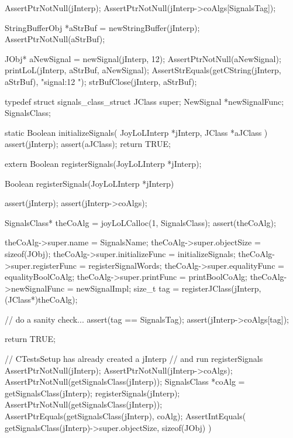 
\startCTest
  AssertPtrNotNull(jInterp);
  AssertPtrNotNull(jInterp->coAlgs[SignalsTag]);

  StringBufferObj *aStrBuf = newStringBuffer(jInterp);
  AssertPtrNotNull(aStrBuf);
  
  JObj* aNewSignal = newSignal(jInterp, 12);
  AssertPtrNotNull(aNewSignal);
  printLoL(jInterp, aStrBuf, aNewSignal);
  AssertStrEquals(getCString(jInterp, aStrBuf), "signal:12 ");
  strBufClose(jInterp, aStrBuf);
\stopCTest
\stopTestCase
\stopTestSuite

\startTestSuite[registerSignals]

\startCHeader
typedef struct signals_class_struct {
  JClass     super;
  NewSignal *newSignalFunc;
} SignalsClass;

\stopCHeader

\startCCode
static Boolean initializeSignals(
  JoyLoLInterp *jInterp,
  JClass       *aJClass
) {
  assert(jInterp);
  assert(aJClass);
  return TRUE;
}
\stopCCode

\startCHeader
extern Boolean registerSignals(JoyLoLInterp *jInterp);
\stopCHeader
{}

\startCCode
Boolean registerSignals(JoyLoLInterp *jInterp) {
  assert(jInterp);
  assert(jInterp->coAlgs);
  
  SignalsClass* theCoAlg
    = joyLoLCalloc(1, SignalsClass);
  assert(theCoAlg);
  
  theCoAlg->super.name           = SignalsName;
  theCoAlg->super.objectSize     = sizeof(JObj);
  theCoAlg->super.initializeFunc = initializeSignals;
  theCoAlg->super.registerFunc   = registerSignalWords;
  theCoAlg->super.equalityFunc   = equalityBoolCoAlg;
  theCoAlg->super.printFunc      = printBoolCoAlg;
  theCoAlg->newSignalFunc        = newSignalImpl;
  size_t tag =
    registerJClass(jInterp, (JClass*)theCoAlg);
  
  // do a sanity check...
  assert(tag == SignalsTag);
  assert(jInterp->coAlgs[tag]);
   
  return TRUE;
}
\stopCCode


\startCTest
  // CTestsSetup has already created a jInterp
  // and run registerSignals
  AssertPtrNotNull(jInterp);
  AssertPtrNotNull(jInterp->coAlgs);
  AssertPtrNotNull(getSignalsClass(jInterp));
  SignalsClass *coAlg = getSignalsClass(jInterp);
  registerSignals(jInterp);
  AssertPtrNotNull(getSignalsClass(jInterp));
  AssertPtrEquals(getSignalsClass(jInterp), coAlg);
  AssertIntEquals(
    getSignalsClass(jInterp)->super.objectSize,
    sizeof(JObj)
  )
\stopCTest
\stopTestCase
\stopTestSuite
